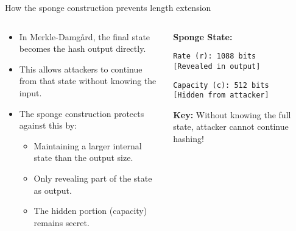 \documentclass[aspectratio=169, lualatex, handout]{beamer}
\begin{document}
\begin{frame}{How the sponge construction prevents length extension}
	\begin{columns}[c]
		\begin{column}{0.55\textwidth}
			\begin{itemize}[<+->]
				\item In Merkle-Damg\aa rd, the final state becomes the hash output directly.
				\item This allows attackers to continue from that state without knowing the input.
				\item The sponge construction protects against this by:
				      \begin{itemize}
					      \item Maintaining a larger internal state than the output size.
					      \item Only revealing part of the state as output.
					      \item The hidden portion (capacity) remains secret.
				      \end{itemize}
			\end{itemize}
		\end{column}
		\begin{column}{0.45\textwidth}
			\begin{tcolorbox}[colback=black!5!white,colframe=ciphergray]
				\textbf{Sponge State:}

				\vspace{0.2cm}

				\texttt{Rate (r): 1088 bits}\\
				\textcolor{cipheraccent}{\texttt{[Revealed in output]}}

				\vspace{0.2cm}

				\texttt{Capacity (c): 512 bits}\\
				\textcolor{cipherprimary}{\texttt{[Hidden from attacker]}}

				\vspace{0.3cm}

				\textcolor{cipherprimary}{\textbf{Key:} \small Without knowing the full state, attacker cannot continue hashing!}
			\end{tcolorbox}
		\end{column}
	\end{columns}
\end{frame}
\end{document}
